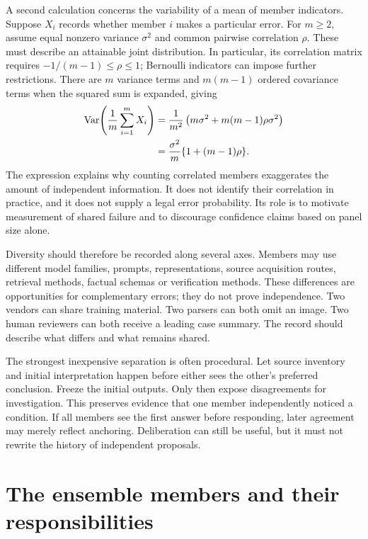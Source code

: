 \documentclass[12pt,a4paper,oneside,openany]{book}
\begin{document}
A second calculation concerns the variability of a mean of member indicators.
Suppose $X_i$ records whether member $i$ makes a particular error. For
$m\geq2$, assume equal nonzero variance $\sigma^2$ and common pairwise
correlation $\rho$. These must describe an attainable joint distribution.
In particular, its correlation matrix requires
$-1/(m-1)\leq\rho\leq1$; Bernoulli indicators can impose further
restrictions. There are $m$ variance terms and $m(m-1)$ ordered covariance
terms when the squared sum is expanded, giving
\begin{align}
 \operatorname{Var}\!\left(\frac1m\sum_{i=1}^m X_i\right)
 &=\frac{1}{m^2}\left(m\sigma^2+m(m-1)\rho\sigma^2\right)\notag\\
 &=\frac{\sigma^2}{m}\{1+(m-1)\rho\}.
 \label{eq:ensemble-variance}
\end{align}
The expression explains why counting correlated members exaggerates the amount
of independent information. It does not identify their correlation in practice,
and it does not supply a legal error probability. Its role is to motivate
measurement of shared failure and to discourage confidence claims based on panel
size alone.

Diversity should therefore be recorded along several axes. Members may use
different model families, prompts, representations, source acquisition routes,
retrieval methods, factual schemas or verification methods. These differences are
opportunities for complementary errors; they do not prove independence. Two
vendors can share training material. Two parsers can both omit an image. Two human
reviewers can both receive a leading case summary. The record should describe
what differs and what remains shared.

The strongest inexpensive separation is often procedural. Let source inventory
and initial interpretation happen before either sees the other's preferred
conclusion. Freeze the initial outputs. Only then expose disagreements for
investigation. This preserves evidence that one member independently noticed a
condition. If all members see the first answer before responding, later agreement
may merely reflect anchoring. Deliberation can still be useful, but it must not
rewrite the history of independent proposals.

\section{The ensemble members and their responsibilities}
\label{merge:M06:02}
\end{document}
